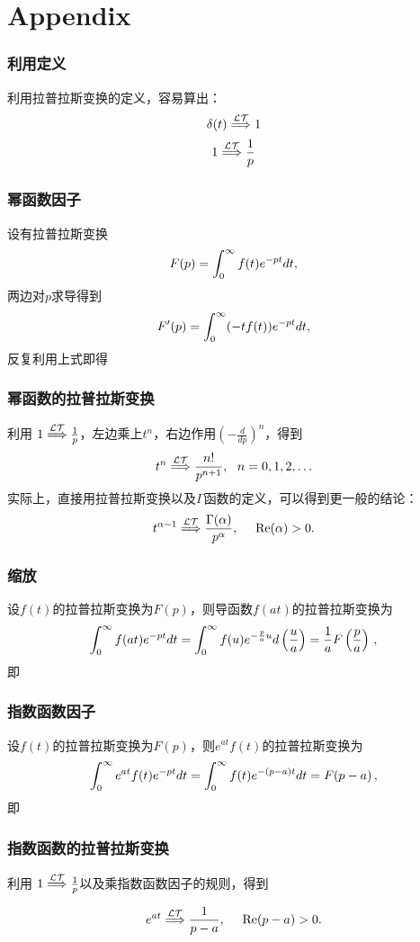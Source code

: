 \documentclass[CJK]{beamer}
\begin{document}
\section{Appendix}


\begin{frame}
\frametitle{利用定义}
利用拉普拉斯变换的定义，容易算出：
$$\delta(t) \stackrel{\mathcal{LT}}{\Longrightarrow} 1 $$
$$1 \stackrel{\mathcal{LT}}{\Longrightarrow} \frac{1}{p} $$
\end{frame}

\begin{frame}
\frametitle{幂函数因子}

设有拉普拉斯变换
$$ F(p) = \int_0^\infty f(t) e^{-pt} dt, $$
两边对$p$求导得到
$$ F'(p) = \int_0^\infty (-tf(t)) e^{-pt} dt, $$
反复利用上式即得

\end{frame}


\begin{frame}
  \frametitle{幂函数的拉普拉斯变换}
  
  利用 $1 \stackrel{\mathcal{LT}}{\Longrightarrow} \frac{1}{p} $，左边乘上$t^n$，右边作用$\left(-\frac{d}{dp}\right)^n$，得到
   $$ t^n \ltf \frac{n!}{p^{n+1}},\ \ n=0,1,2,\ldots $$
  实际上，直接用拉普拉斯变换以及$\Gamma$函数的定义，可以得到更一般的结论：
  {\blue  $$ t^{\alpha-1} \stackrel{\mathcal{LT}}{\Longrightarrow} \frac{\Gamma(\alpha)}{p^{\alpha}},\ \ \ \ \mathrm{Re}(\alpha) >  0.$$}
  
  
\end{frame}

\begin{frame}
\frametitle{缩放}

设$f(t)$的拉普拉斯变换为$F(p)$，则导函数$f(at)$的拉普拉斯变换为
$$\int_0^\infty f(at) e^{-pt} dt =  \int_0^\infty f(u) e^{-\frac{p}{a}u} d\left(\frac{u}{a}\right) = \frac{1}{a}F\left(\frac{p}{a}\right)\,,$$
即

\end{frame}

\begin{frame}
\frametitle{指数函数因子}

设$f(t)$的拉普拉斯变换为$F(p)$，则$e^{at}f(t)$的拉普拉斯变换为
$$\int_0^\infty e^{at}f(t) e^{-pt} dt  = \int_0^\infty f(t) e^{-(p-a)t} dt  = F(p-a)\,,$$
即

\end{frame}

\begin{frame}
  \frametitle{指数函数的拉普拉斯变换}
  
  利用 $1 \stackrel{\mathcal{LT}}{\Longrightarrow} \frac{1}{p} $以及乘指数函数因子的规则，得到

  {\blue  $$ e^{at} \ltf \frac{1}{p-a},\ \ \ \ \mathrm{Re}(p-a)>0.$$}
  
\end{frame}
\end{document}
